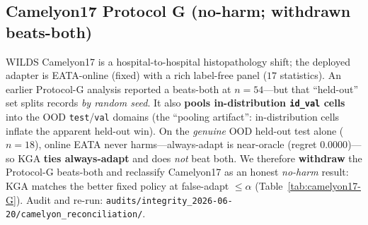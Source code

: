 \documentclass[conference]{IEEEtran}
\theoremstyle{plain}
\theoremstyle{definition}
\theoremstyle{remark}
\begin{document}
\subsection{Camelyon17 Protocol G (no-harm; withdrawn beats-both)}
WILDS Camelyon17 is a hospital-to-hospital histopathology shift; the deployed adapter is
EATA-online (fixed) with a rich label-free panel ($17$ statistics). An earlier Protocol-G
analysis reported a beats-both at $n{=}54$---but that ``held-out'' set splits records \emph{by
random seed}. It also \textbf{pools in-distribution \texttt{id\_val} cells} into the OOD
\texttt{test}/\texttt{val} domains (the ``pooling artifact'': in-distribution cells inflate the
apparent held-out win). On the \emph{genuine} OOD held-out test alone ($n{=}18$),
online EATA never harms---always-adapt is near-oracle (regret $0.0000$)---so \textsc{KGA}
\textbf{ties always-adapt} and does \emph{not} beat both. We therefore \textbf{withdraw} the
Protocol-G beats-both and reclassify Camelyon17 as an honest \emph{no-harm} result: \textsc{KGA}
matches the better fixed policy at false-adapt $\le\alpha$ (Table~\ref{tab:camelyon17-G}). Audit
and re-run: \texttt{audits/integrity\_2026-06-20/camelyon\_reconciliation/}.

\begin{table}[t]\centering\small
\caption{\textbf{Camelyon17 Protocol~G: withdrawn beats-both.} The locked $n{=}54$ ``held-out''
set pools in-distribution \texttt{id\_val} with the OOD domains. On genuine OOD test alone
($n{=}18$) online EATA never harms, so \textsc{KGA} ties always-adapt---a no-harm result, not a win.}
\label{tab:camelyon17-G}
\end{table}
\end{document}
